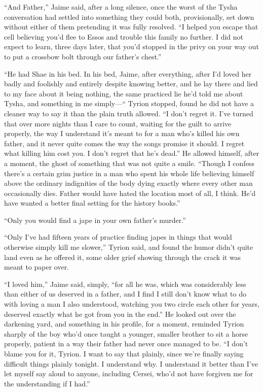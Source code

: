 “And Father,” Jaime said, after a long silence, once the worst of the Tysha conversation had settled into something they could both, provisionally, set down without either of them pretending it was fully resolved. “I helped you escape that cell believing you’d flee to Essos and trouble this family no further. I did not expect to learn, three days later, that you’d stopped in the privy on your way out to put a crossbow bolt through our father’s chest.”

“He had Shae in his bed. In his bed, Jaime, after everything, after I’d loved her badly and foolishly and entirely despite knowing better, and he lay there and lied to my face about it being nothing, the same practiced lie he’d told me about Tysha, and something in me simply—“ Tyrion stopped, found he did not have a cleaner way to say it than the plain truth allowed. “I don’t regret it. I’ve turned that over more nights than I care to count, waiting for the guilt to arrive properly, the way I understand it’s meant to for a man who’s killed his own father, and it never quite comes the way the songs promise it should. I regret what killing him cost you. I don’t regret that he’s dead.” He allowed himself, after a moment, the ghost of something that was not quite a smile. “Though I confess there’s a certain grim justice in a man who spent his whole life believing himself above the ordinary indignities of the body dying exactly where every other man occasionally dies. Father would have hated the location most of all, I think. He’d have wanted a better final setting for the history books.”

“Only you would find a jape in your own father’s murder.”

“Only I’ve had fifteen years of practice finding japes in things that would otherwise simply kill me slower,” Tyrion said, and found the humor didn’t quite land even as he offered it, some older grief showing through the crack it was meant to paper over.

“I loved him,” Jaime said, simply, “for all he was, which was considerably less than either of us deserved in a father, and I find I still don’t know what to do with loving a man I also understood, watching you two circle each other for years, deserved exactly what he got from you in the end.” He looked out over the darkening yard, and something in his profile, for a moment, reminded Tyrion sharply of the boy who’d once taught a younger, smaller brother to sit a horse properly, patient in a way their father had never once managed to be. “I don’t blame you for it, Tyrion. I want to say that plainly, since we’re finally saying difficult things plainly tonight. I understand why. I understand it better than I’ve let myself say aloud to anyone, including Cersei, who’d not have forgiven me for the understanding if I had.”

